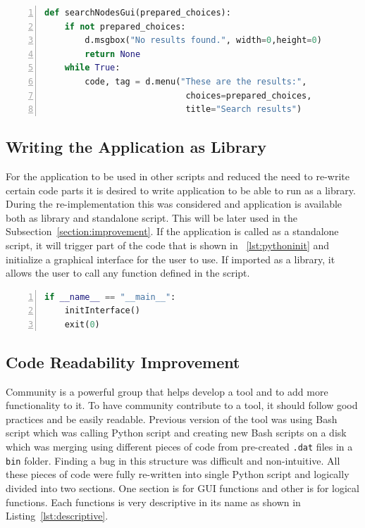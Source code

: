 {\noindent\begin{minipage}{\linewidth}
\begin{lstlisting}[language=Python, numbers=left, label={lst:removingresultlimit}, caption=Removing Result Limitation, frame=single, showstringspaces=false, keywordstyle=\color{blue},captionpos=b]
def searchNodesGui(prepared_choices):
	if not prepared_choices:
		d.msgbox("No results found.", width=0,height=0)
		return None
	while True:
		code, tag = d.menu("These are the results:",
							choices=prepared_choices,
							title="Search results")
\end{lstlisting}
\end{minipage}

\subsection{Writing the Application as Library}
For the application to be used in other scripts and reduced the need to re-write certain code parts it is desired to write application to be able to run as a library. During the re-implementation this was considered and application is available both as library and standalone script. This will be later used in the Subsection~\ref{section:improvement}. If the application is called as a standalone script, it will trigger part of the code that is shown in ~\ref{lst:pythoninit} and initialize a graphical interface for the user to use. If imported as a library, it allows the user to call any function defined in the script.

{\noindent\begin{minipage}{\linewidth}
\begin{lstlisting}[language=Python, numbers=left, label={lst:pythoninit}, caption=Condition to recognize that application is being called as a standalone script., frame=single, showstringspaces=false, breaklines=true, keywordstyle=\color{blue},captionpos=b]
if __name__ == "__main__":
	initInterface()
	exit(0)
\end{lstlisting}
\end{minipage}

\subsection{Code Readability Improvement}
\label{subsection:readability}
Community is a powerful group that helps develop a tool and to add more functionality to it. To have community contribute to a tool, it should follow good practices and be easily readable. Previous version of the tool was using Bash script which was calling Python script and creating new Bash scripts on a disk which was merging using different pieces of code from pre-created \texttt{.dat} files in a \texttt{bin} folder. Finding a bug in this structure was difficult and non-intuitive. All these pieces of code were fully re-written into single Python script and logically divided into two sections. One section is for GUI functions and other is for logical functions. Each functions is very descriptive in its name as shown in Listing~\ref{lst:descriptive}.

}}
